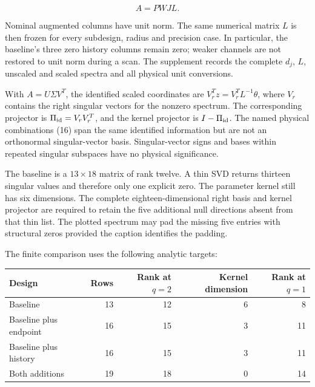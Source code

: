 \[
A=PWJL.                                                 \tag{21}
\]

Nominal augmented columns have unit norm. The same numerical matrix \(L\) is then frozen for every subdesign, radius and precision case. In particular, the baseline's three zero history columns remain zero; weaker channels are not restored to unit norm during a scan. The supplement records the complete \(d_j\), \(L\), unscaled and scaled spectra and all physical unit conversions.

With \(A=U\Sigma V^T\), the identified scaled coordinates are \(V_r^Tz=V_r^TL^{-1}\theta\), where \(V_r\) contains the right singular vectors for the nonzero spectrum. The corresponding projector is \(\Pi_{\rm id}=V_rV_r^T\), and the kernel projector is \(I-\Pi_{\rm id}\). The named physical combinations (16) span the same identified information but are not an orthonormal singular-vector basis. Singular-vector signs and bases within repeated singular subspaces have no physical significance.

The baseline is a \(13\times18\) matrix of rank twelve. A thin SVD returns thirteen singular values and therefore only one explicit zero. The parameter kernel still has six dimensions. The complete eighteen-dimensional right basis and kernel projector are required to retain the five additional null directions absent from that thin list. The plotted spectrum may pad the missing five entries with structural zeros provided the caption identifies the padding.

The finite comparison uses the following analytic targets:

\begin{longtable}[]{@{}lrrrr@{}}
\toprule\noalign{}
Design & Rows & Rank at \(q=2\) & Kernel dimension & Rank at \(q=1\) \\
\midrule\noalign{}
\endhead
\bottomrule\noalign{}
\endlastfoot
Baseline & 13 & 12 & 6 & 8 \\
Baseline plus endpoint & 16 & 15 & 3 & 11 \\
Baseline plus history & 16 & 15 & 3 & 11 \\
Both additions & 19 & 18 & 0 & 14 \\
\end{longtable}

